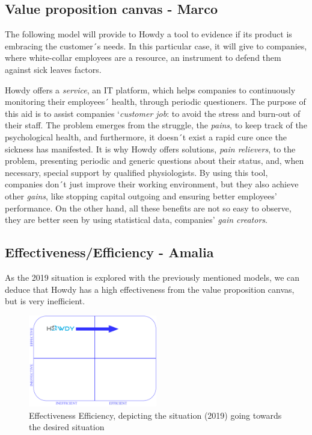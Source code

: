 \subsection{Value proposition canvas - Marco}

The following model will provide to Howdy a tool to evidence if its product is embracing the customer´s needs. In this particular case, it will give to companies, where white-collar employees are a resource, an instrument to defend them against sick leaves factors.

Howdy offers a \textit{service}, an IT platform, which helps companies to continuously monitoring their employees´ health, through periodic questioners. The purpose of this aid is to assist companies ‘\textit{customer job}: to avoid the stress and burn-out of their staff. 
The problem emerges from the struggle, the \textit{pains}, to keep track of the psychological health, and furthermore, it doesn´t exist a rapid cure once the sickness has manifested. It is why Howdy offers solutions, \textit{pain relievers}, to the problem, presenting periodic and generic questions about their status, and, when necessary, special support by qualified physiologists.    
By using this tool, companies don´t just improve their working environment, but they also achieve other \textit{gains}, like stopping capital outgoing and ensuring better employees’ performance. On the other hand, all these benefits are not so easy to observe, they are better seen by using statistical data, companies’ \textit{gain creators}.





\subsection{Effectiveness/Efficiency - Amalia }

As the 2019 situation is explored with the previously mentioned models, we can deduce that Howdy has a high effectiveness from the value proposition canvas, but is very inefficient. 

\begin{figure}
\centering
\includegraphics[width=0.5\textwidth]{figures/effiTEMO.png}
\caption{Effectiveness Efficiency, depicting the situation (2019) going towards the desired situation}
\label{fig:eff}
\end{figure}

